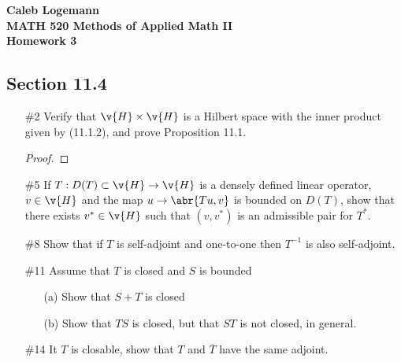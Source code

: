 \documentclass[11pt, oneside]{article}
\begin{document}
\noindent \textbf{\Large{Caleb Logemann \\
MATH 520 Methods of Applied Math II \\
Homework 3
}}

\subsection*{Section 11.4}
\begin{enumerate}
  \item[\#2]
    Verify that $\v{H} \times \v{H}$ is a Hilbert space with the inner product
    given by (11.1.2), and prove Proposition 11.1.

    \begin{proof}
      
    \end{proof}

  \pagebreak
  \item[\#5]
    If $T: D(T) \subset \v{H} \to \v{H}$ is a densely defined linear operator,
    $v \in \v{H}$ and the map $u \to \abr{Tu, v}$ is bounded on $D(T)$, show
    that there exists $v^* \in \v{H}$ such that $(v, v^*)$ is an admissible pair
    for $T^*$.

  \pagebreak
  \item[\#8]
    Show that if $T$ is self-adjoint and one-to-one then $T^{-1}$ is also
    self-adjoint.

  \pagebreak
  \item[\#11]
    Assume that $T$ is closed and $S$ is bounded
    \begin{enumerate}
      \item[(a)]
        Show that $S + T$ is closed
      \item[(b)]
        Show that $TS$ is closed, but that $ST$ is not closed, in general.
    \end{enumerate}

  \pagebreak
  \item[\#14]
    It $T$ is closable, show that $T$ and $\overline{T}$ have the same adjoint.

\end{enumerate}
\end{document}

